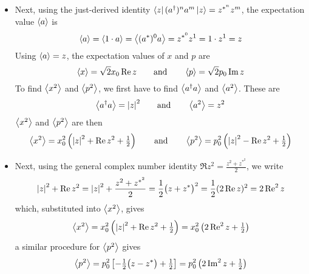 \documentclass[11pt, a4paper]{article}
\newcommand{\eqtext}[1]{\qquad \text{#1} \qquad}
\newcommand{\evb}[1]{\big \langle {#1} \big \rangle}  %
\begin{document}
\begin{itemize}
	\item Next, using the just-derived identity $ \bra{z}(a^{\dagger})^{n}a^{m}\ket{z} = z^{*^{n}}z^{m} $, the expectation value $ \ev{a} $ is
	\begin{equation*}
		\ev{a} = \ev{1\cdot a} = \ev{(a^{*})^{0}a} = z^{*^{0}}z^{1} = 1 \cdot z^{1} = z
	\end{equation*}
	Using $ \ev{a} = z $, the expectation values of $ x $ and $ p $ are
	\begin{equation*}
		\ev{x} = \sqrt{2} x_{0}\Re z \eqtext{and} \ev{p} = \sqrt{2}p_{0}\Im z
	\end{equation*}
	To find $ \ev{x^{2}} $ and $ \ev{p^{2}} $, we first have to find $ \ev{a^{\dagger}a} $ and $ \ev{a^{2}} $. These are
	\begin{equation*}
		\evb{a^{\dagger}a} = \abs{z}^{2} \eqtext{and} \ev{a^{2}} = z^{2}
	\end{equation*}
	$ \ev{x^{2}} $ and $ \ev{p^{2}} $ are then
	\begin{equation*}
		\ev{x^{2}} = x_{0}^{2} \left(\abs{z}^{2} + \Re z^{2} + \tfrac{1}{2}\right) \eqtext{and} \ev{p^{2}} = p_{0}^{2}\left(\abs{z}^{2} - \Re z^{2} + \tfrac{1}{2}\right)
	\end{equation*}
	
	\item Next, using the  general complex number identity $ \Re z^{2} = \frac{z^{2}+z^{*^{2}}}{2}  $, we write
	\begin{equation*}
		\abs{z}^{2} + \Re z^{2} = \abs{z}^{2} + \frac{z^{2}+z^{*^{2}}}{2} = \frac{1}{2}\big(z + z^{*}\big)^{2} = \frac{1}{2}(2\Re z)^{2} = 2 \Re^{2}z
	\end{equation*}
	which, substituted into $ \ev{x^{2}} $, gives
	\begin{equation*}
		\ev{x^{2}} = x_{0}^{2} \left(\abs{z}^{2} + \Re z^{2} + \tfrac{1}{2}\right) = x_{0}^{2}\left(2 \Re^{2}z + \tfrac{1}{2}\right)
	\end{equation*}
	a similar procedure for $ \ev{p^{2}} $ gives
	\begin{equation*}
		\ev{p^{2}} = p_{0}^{2}\left[-\tfrac{1}{2}\big(z-z^{*}\big) + \tfrac{1}{2}\right] = p_{0}^{2}\left(2 \Im^{2}z + \tfrac{1}{2}\right)
	\end{equation*}
	

\end{itemize}
\end{document}
